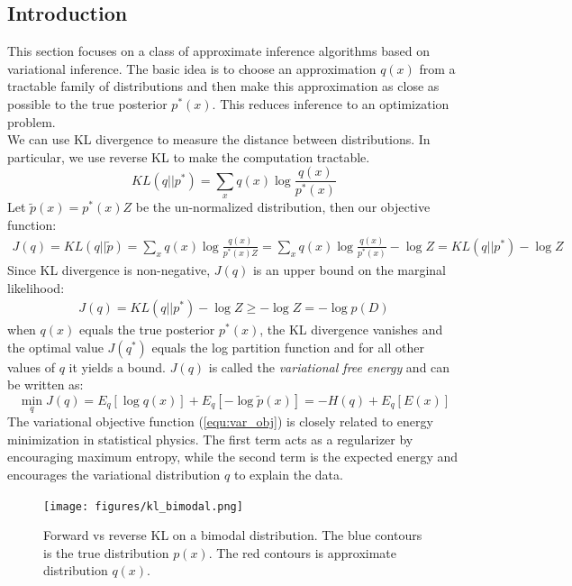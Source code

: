 \subsection{Introduction}

This section focuses on a class of approximate inference algorithms based on variational inference. The basic idea is to choose an approximation $q(x)$ from a tractable family of distributions and then make this approximation as close as possible to the true posterior $p^{\ast}(x)$. This reduces inference to an optimization problem.\\

We can use KL divergence to measure the distance between distributions. In particular, we use reverse KL to make the computation tractable.
\begin{equation}
    KL(q||p^{\ast}) = \sum_x q(x) \log \frac{q(x)}{p^{\ast}(x)}
\end{equation}
Let $\tilde{p}(x)=p^{\ast}(x)Z$ be the un-normalized distribution, then our objective function:
\begin{eqnarray}
    J(q) = KL(q||\tilde{p})= \sum_x q(x) \log \frac{q(x)}{p^{\ast}(x)Z} 
    = \sum_x q(x) \log \frac{q(x)}{p^{\ast}(x)} - \log Z = KL(q||p^{\ast}) - \log Z
\end{eqnarray}
Since KL divergence is non-negative, $J(q)$ is an upper bound on the marginal likelihood:
\begin{eqnarray}
    J(q) = KL(q||p^{\ast}) - \log Z \geq -\log Z = -\log p(D)
\end{eqnarray}
when $q(x)$ equals the true posterior $p^{\ast}(x)$, the KL divergence vanishes and the optimal value $J(q^{\ast})$ equals the log partition function and for all other values of $q$ it yields a bound. $J(q)$ is called the \textit{variational free energy} and can be written as:
\begin{equation}\label{equ:var_obj}
   \min_q J(q) = E_{q}[\log q(x)]+E_{q}[-\log \tilde{p}(x)] = -H(q) + E_q[E(x)]
\end{equation}
The variational objective function (\ref{equ:var_obj}) is closely related to energy minimization in statistical physics. The first term acts as a regularizer by encouraging maximum entropy, while the second term is the expected energy and encourages the variational distribution $q$ to explain the data. 

\begin{figure}[tbhp]
    \centering
    \texttt{[image: figures/kl\_bimodal.png]}
    \caption{Forward vs reverse KL on a bimodal distribution. The blue contours is the true distribution $p(x)$. The red contours is approximate distribution $q(x)$.}
    \label{fig:kl_bimodal}
\end{figure}

